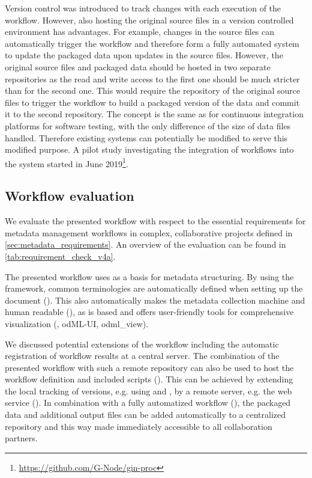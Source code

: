 Version control was introduced to track changes with each execution of the workflow. However, also hosting the original source files in a version controlled environment has advantages. For example, changes in the source files can automatically trigger the workflow and therefore form a fully automated system to update the packaged data upon updates in the source files. However, the original source files and packaged data should be hosted in two separate repositories as the read and write access to the first one should be much stricter than for the second one. This would require the repository of the original source files to trigger the  workflow to build a packaged version of the data and commit it to the second repository. The concept is the same as for continuous integration platforms for software testing, with the only difference of the size of data files handled. Therefore existing systems can potentially be modified to serve this modified purpose. A pilot study investigating the integration of  workflows into the  system started in June 2019\footnote{\url{https://github.com/G-Node/gin-proc}}.


\subsection{Workflow evaluation}
We evaluate the presented  workflow with respect to the essential requirements for metadata management workflows in complex, collaborative projects defined in \cref{sec:metadata_requirements}. An overview of the evaluation can be found in \cref{tab:requirement_check_v4a}.

The presented workflow uses  as a basis for metadata structuring. By using the  framework, common terminologies are automatically defined when setting up the  document (). This also automatically makes the metadata collection machine and human readable (), as  is  based and offers user-friendly tools for comprehensive visualization (, odML-UI, odml\_view).

We discussed potential extensions of the workflow including the automatic registration of workflow results at a central server. The combination of the presented workflow with such a remote repository can also be used to host the workflow definition and included scripts (). This can be achieved by extending the local tracking of versions, e.g. using  and , by a remote server, e.g. the  web service (). In combination with a fully automatized workflow (), the packaged data and additional output files can be added automatically to a centralized repository and this way made immediately accessible to all collaboration partners.


